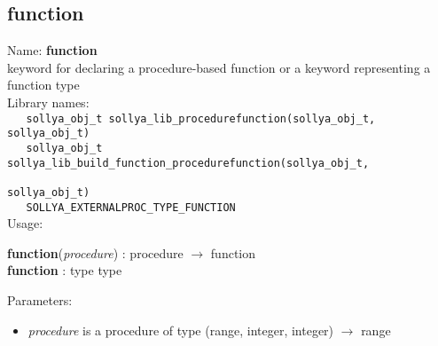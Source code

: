 \subsection{function}
\label{labfunction}
\noindent Name: \textbf{function}\\
\phantom{aaa}keyword for declaring a procedure-based function or a keyword representing a \textsf{function} type \\[0.2cm]
\noindent Library names:\\
\verb|   sollya_obj_t sollya_lib_procedurefunction(sollya_obj_t, sollya_obj_t)|\\
\verb|   sollya_obj_t sollya_lib_build_function_procedurefunction(sollya_obj_t,|\\
\verb|                                                            sollya_obj_t)|\\
\verb|   SOLLYA_EXTERNALPROC_TYPE_FUNCTION|\\[0.2cm]
\noindent Usage: 
\begin{center}
\textbf{function}(\emph{procedure})  : \textsf{procedure} $\rightarrow$ \textsf{function}\\
\textbf{function} : \textsf{type type}\\
\end{center}
Parameters: 
\begin{itemize}
\item \emph{procedure} is a procedure of type (\textsf{range}, \textsf{integer}, \textsf{integer}) $\rightarrow$ \textsf{range}
\end{itemize}
